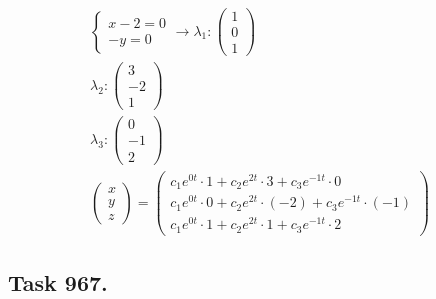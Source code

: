 \documentclass{article}
\begin{document}
\begin{fleqn}[1\parindent]
\begin{gather*}
    \begin{cases}
      x-2=0 \\ 
      -y=0
    \end{cases} \rightarrow
    \lambda_1: \begin{pmatrix}
      1 \\ 0 \\ 1
    \end{pmatrix} \\
    \lambda_2: \begin{pmatrix}
      3 \\ -2 \\ 1
    \end{pmatrix} \\ 
    \lambda_3: \begin{pmatrix}
      0 \\ -1 \\ 2
    \end{pmatrix} \\ 
    \begin{pmatrix}
      x \\ y \\ z
    \end{pmatrix} = 
    \begin{pmatrix}
      c_1e^{0t}\cdot1+c_2e^{2t}\cdot 3+c_3e^{-1t}\cdot 0 \\ 
      c_1e^{0t}\cdot0+c_2e^{2t}\cdot (-2)+c_3e^{-1t}\cdot (-1) \\
      c_1e^{0t}\cdot1+c_2e^{2t}\cdot 1+c_3e^{-1t}\cdot 2
    \end{pmatrix}
  \end{gather*}
\end{fleqn}

\subsection*{Task 967.}
\end{document}
